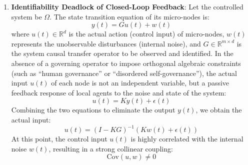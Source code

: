 \documentclass{article}
\begin{document}
\begin{enumerate}
    \item \textbf{Identifiability Deadlock of Closed-Loop Feedback}:
    Let the controlled system be $\Omega$. The state transition equation of its micro-nodes is:
    \begin{equation}
        y(t) = G u(t) + w(t)
    \end{equation}
    where $u(t) \in \mathbb{R}^d$ is the actual action (control input) of micro-nodes, $w(t)$ represents the unobservable disturbances (internal noise), and $G \in \mathbb{R}^{m \times d}$ is the system causal transfer operator to be observed and identified.
    In the absence of a governing operator to impose orthogonal algebraic constraints (such as ``human governance'' or ``disordered self-governance''), the actual input $u(t)$ of each node is not an independent variable, but a passive feedback response of local agents to the noise and state of the system:
    \begin{equation}
        u(t) = K y(t) + \epsilon(t)
    \end{equation}
    Combining the two equations to eliminate the output $y(t)$, we obtain the actual input:
    \begin{equation}
        u(t) = (I - KG)^{-1} (Kw(t) + \epsilon(t))
    \end{equation}
    At this point, the control input $u(t)$ is highly correlated with the internal noise $w(t)$, resulting in a strong collinear coupling:
    \begin{equation}
        \text{Cov}(u, w) \neq 0
    \end{equation}
    

\end{enumerate}
\end{document}
